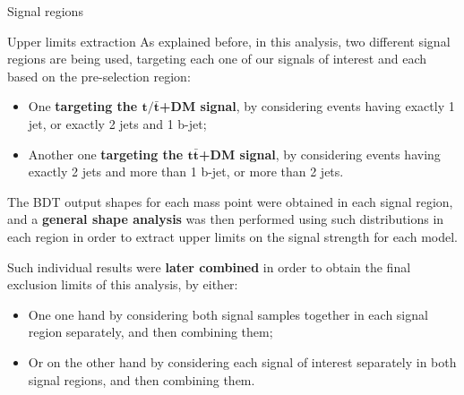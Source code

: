 \documentclass[8pt]{beamer}
\begin{document}
\begin{frame}[standout]
Signal regions
\end{frame}

\begin{frame}{Upper limits extraction}
\justifying
As explained before, in this analysis, \alert{two different signal regions} are being used, targeting each one of our signals of interest and each based on the pre-selection region:
\begin{itemize}
\item One \textbf{targeting the $\bm{t/\bar t}$+DM signal}, by considering events having exactly 1 jet, or exactly 2 jets and 1 b-jet;
\item Another one \textbf{targeting the $\bm{t \bar t}$+DM signal}, by considering events having exactly 2 jets and more than 1 b-jet, or more than 2 jets.
\end{itemize} \vfill

The BDT output shapes for each mass point were obtained in each signal region, and a \textbf{general shape analysis} was then performed using such distributions in each region in order to \alert{extract upper limits on the signal strength} for each model. 

Such individual results were \textbf{later combined} in order to obtain the final exclusion limits of this analysis, by either:
\begin{itemize}
\justifying
\item One one hand by considering both signal samples together in each signal region separately, and then combining them;
\item Or on the other hand by considering each signal of interest separately in both signal regions, and then combining them.
\end{itemize} \vfill
\end{frame}
\end{document}
